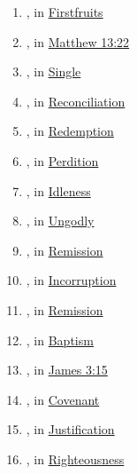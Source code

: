 \begin{enumerate}
		\item \hyperref[APARCHE]{}, in \hyperref[FIRSTFRUITS]{Firstfruits}
		
		\item \hyperref[APATE]{}, in \hyperref[MATTHEW-13-22]{Matthew 13:22}
		
		\item \hyperref[HAPLOUS]{}, in \hyperref[SINGLE]{Single}
		
		\item \hyperref[APOKATALLASSO]{}, in \hyperref[RECONCILIATION]{Reconciliation}
		
		\item \hyperref[APOLUTROSIS]{}, in \hyperref[REDEMPTION]{Redemption}
		
		\item \hyperref[APOLEIA]{}, in \hyperref[SONSOFPERDITION]{Perdition}
		
		\item \hyperref[ARGOS]{}, in \hyperref[IDLENESS]{Idleness}
		
		\item \hyperref[ASEBES]{}, in \hyperref[UNGODLY]{Ungodly}
		
		\item \hyperref[APHESIS]{}, in \hyperref[REMISSION]{Remission}
		
		\item \hyperref[APHTHARSIA]{}, in \hyperref[INCORRUPTION]{Incorruption}
		
		\item \hyperref[APHIEMI]{}, in \hyperref[REMISSION]{Remission}
		
		\item \hyperref[BAPTIZO]{}, in \hyperref[BAPTISM]{Baptism}
		
		\item \hyperref[DAIMONIODES]{}, in \hyperref[JAMES-3-15]{James 3:15}
		
		\item \hyperref[DIATHEKE]{}, in \hyperref[COVENANT]{Covenant}
		
		\item \hyperref[DIKAIOO]{}, in \hyperref[JUSTIFICATION]{Justification}
		
		\item \hyperref[DIKAIOS]{}, in \hyperref[RIGHTEOUSNESS]{Righteousness}
		

\end{enumerate}
